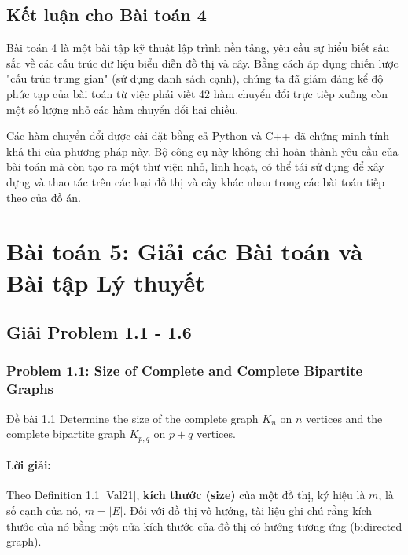 \documentclass[a4paper,12pt]{article}
\begin{document}
\subsection{Kết luận cho Bài toán 4}
Bài toán 4 là một bài tập kỹ thuật lập trình nền tảng, yêu cầu sự hiểu biết sâu sắc về các cấu trúc dữ liệu biểu diễn đồ thị và cây. Bằng cách áp dụng chiến lược "cấu trúc trung gian" (sử dụng danh sách cạnh), chúng ta đã giảm đáng kể độ phức tạp của bài toán từ việc phải viết 42 hàm chuyển đổi trực tiếp xuống còn một số lượng nhỏ các hàm chuyển đổi hai chiều.

Các hàm chuyển đổi được cài đặt bằng cả Python và C++ đã chứng minh tính khả thi của phương pháp này. Bộ công cụ này không chỉ hoàn thành yêu cầu của bài toán mà còn tạo ra một thư viện nhỏ, linh hoạt, có thể tái sử dụng để xây dựng và thao tác trên các loại đồ thị và cây khác nhau trong các bài toán tiếp theo của đồ án.


\section{Bài toán 5: Giải các Bài toán và Bài tập Lý thuyết}
\subsection{Giải Problem 1.1 - 1.6}

\subsubsection{Problem 1.1: Size of Complete and Complete Bipartite Graphs}
\begin{problembox}{Đề bài 1.1}
    Determine the size of the complete graph $K_n$ on $n$ vertices and the complete bipartite graph $K_{p,q}$ on $p+q$ vertices.
\end{problembox}

\paragraph{Lời giải:}
Theo Definition 1.1 [Val21], \textbf{kích thước (size)} của một đồ thị, ký hiệu là $m$, là số cạnh của nó, $m = |E|$. Đối với đồ thị vô hướng, tài liệu ghi chú rằng kích thước của nó bằng một nửa kích thước của đồ thị có hướng tương ứng (bidirected graph).
\end{document}
